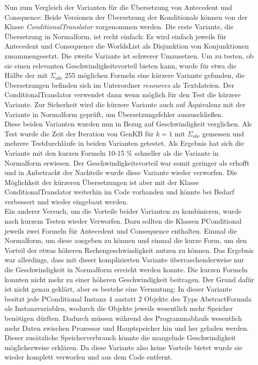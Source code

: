 \documentclass[12pt,a4paper]{article}
\begin{document}
Nun zum Vergleich der Varianten für die Übersetzung von Antecedent und Consquence: Beide  Versionen der Übersetzung der Konditionale können von der Klasse \textit{ConditionalTranslator} vorgenommen werden. Die erste Variante, die Übersetzung in Normalform, ist recht einfach: Es wird einfach jeweils für Antecedent und Consequence die WorldsList als Disjunktion von Konjunktionen zusammengesetzt. Die zweite Variante ist schwerer Umzusetzen. Um zu testen, ob sie einen relevanten Geschwindigkeitsvorteil bieten kann, wurde für etwa die Hälfte der mit $\Sigma_{abc}$ 255 möglichen Formeln eine kürzere Variante gefunden, die Übersetzungen befinden sich im Unterordner \textit{resources} als Textdateien. Der ConditionalTranslator verwendet dann wenn möglich für den Test die kürzere Variante. Zur Sicherheit wird die kürzere Variante auch auf Äquivalenz mit der Variante in Normalform geprüft, um Übersetzungsfehler auszuschließen. \\
Diese beiden Varianten wurden nun in Bezug auf Geschwindigkeit verglichen. Als Test wurde die Zeit der Iteration von GenKB für $k=1$ mit $\Sigma_{abc}$ gemessen und mehrere Testdurchläufe in beiden Varianten getestet. Als Ergebnis hat sich die Variante mit den kurzen Formeln 10-15 $\%$ schneller als die Variante in Normalform erwiesen. Der Geschwindigkeitsvorteil war somit geringer als erhofft und in Anbetracht der Nachteile wurde diese Variante wieder verworfen. Die Möglichkeit der kürzeren Übersetzungen ist aber mit der Klasse ConditionalTranslator weiterhin im Code vorhanden und könnte bei Bedarf verbessert und wieder eingebaut werden. \\
Ein anderer Versuch, um die Vorteile beider Varianten zu kombinieren, wurde nach kurzem Testen wieder Verworfen. Dazu sollten die Klassen PConditional jeweils zwei Formeln für Antecedent und Consequence enthalten. Einmal die Normalform, um diese ausgeben zu können und einmal die kurze Form, um den Vorteil der etwas höheren Rechengeschwindigkeit nutzen zu können. Das Ergebnis war allerdings, dass mit dieser komplizierten Variante überraschenderweise nur die Geschwindigkeit in Normalform erreicht werden konnte. Die kurzen Formeln konnten nicht mehr zu einer höheren Geschwindigkeit beitragen. Der Grund dafür ist nicht genau geklärt, aber es bestehe eine Vermutung: In dieser Variante besitzt jede PConditional Instanz 4 anstatt 2 Objekte des Typs AbstractFormula als Instanzvariablen, wodurch die Objekte jeweils wesentlich mehr Speicher benötigen dürften. Dadurch müssen während des Programmablaufs wesentlich mehr Daten zwischen Prozessor und Hauptspeicher hin und her geladen werden. Dieser zusätzliche Speicherverbrauch könnte die mangelnde Geschwindigkeit möglicherweise erklären. Da diese Variante also keine Vorteile bietet wurde sie wieder komplett verworfen und aus dem Code entfernt.
\end{document}
